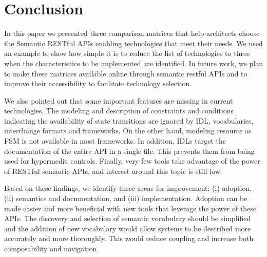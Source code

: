\section{Conclusion}

In this paper we presented three comparison matrices that help architects choose the Semantic RESTful APIs enabling technologies that meet their needs.
We used an example to show how simple it is to reduce the list of technologies to three when the characteristics to be implemented are identified.
In future work, we plan to make these matrices available online through semantic restful APIs and to improve their accessibility to facilitate technology selection.

We also pointed out that some important features are missing in current technologies. The modeling and description of constraints and conditions indicating the availability of state transitions are ignored by IDL, vocabularies, interchange formats and frameworks. On the other hand, modeling resource as FSM is not available in most frameworks. In addition, IDLs target the documentation of the entire API in a single file. This prevents them from being used for hypermedia controls. Finally, very few tools take advantage of the power of RESTful semantic APIs, and interest around this topic is still low.

Based on these findings, we identify three areas for improvement: (i) adoption, (ii) semantics and documentation, and (iii) implementation. Adoption can be made easier and more beneficial with new tools that leverage the power of these APIs. The discovery and selection of semantic vocabulary should be simplified and the addition of new vocabulary would allow systems to be described more accurately and more thoroughly. This would reduce coupling and increase both composability and navigation.

